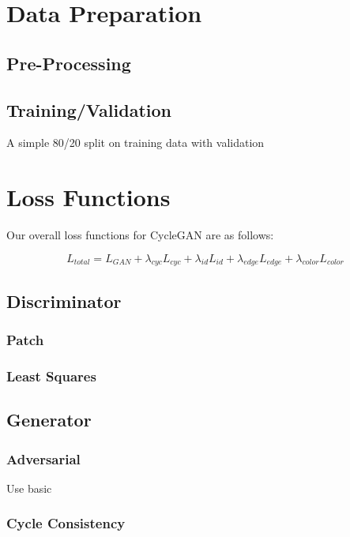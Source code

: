 \documentclass[twoside,english,notitlepage]{report}
\begin{document}
\section{Data Preparation}
\subsection{Pre-Processing}


\subsection{Training/Validation}
A simple 80/20 split on training data with validation



\section{Loss Functions}
Our overall loss functions for CycleGAN are as follows:


\begin{equation}
    L_{total} = L_{GAN} + \lambda_{cyc} L_{cyc} + \lambda_{id} L_{id} + \lambda_{edge} L_{edge} + \lambda_{color} L_{color}
\end{equation}

\subsection{Discriminator}
\subsubsection{Patch}

\subsubsection{Least Squares}

\subsection{Generator}

\subsubsection{Adversarial}
Use basic 

\subsubsection{Cycle Consistency}
\end{document}
